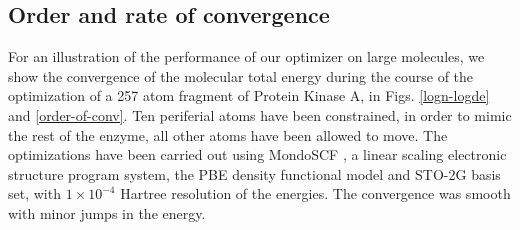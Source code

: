 \documentclass[prl,aps,twocolumn,showpacs,twocolumngrid,superbib]{revtex4}
\begin{document}
\subsection{Order and rate of convergence}
For an illustration of the performance of our optimizer on large
molecules, we show the convergence of the molecular total energy
during the course of the optimization of a 257 atom
fragment of Protein Kinase A, in Figs. \ref{logn-logde} 
and \ref{order-of-conv}. Ten periferial atoms have been 
constrained, in order to mimic the rest of the enzyme, 
all other atoms have been allowed to move.
The optimizations have been carried out 
using MondoSCF \cite{MondoSCF}, a linear scaling electronic structure
program system, the PBE density functional model and 
STO-2G basis set, with $1\times10^{-4}$ Hartree resolution of the energies.
The convergence was smooth with minor jumps in the energy.
\end{document}
